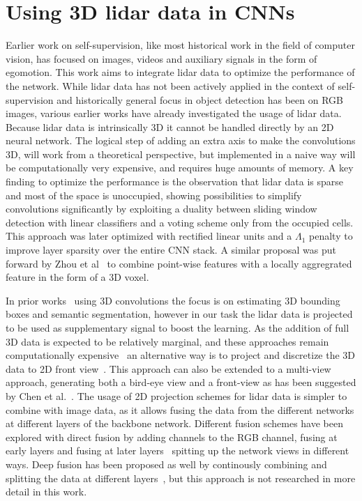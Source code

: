 \section{Using 3D lidar data in CNNs}
Earlier work on self-supervision, like most historical work in the field of computer vision, has focused on images, videos and auxiliary signals in the form of egomotion. This work aims to integrate lidar data to optimize the performance of the network. While lidar data has not been actively applied in the context of self-supervision and historically general focus in object detection has been on RGB images, various earlier works have already investigated the usage of lidar data. Because lidar data is intrinsically 3D it cannot be handled directly by an 2D neural network. The logical step of adding an extra axis to make the convolutions 3D, will work from a theoretical perspective, but implemented in a naive way will be computationally very expensive, and requires huge amounts of memory. A key finding to optimize the performance is the observation that lidar data is sparse and most of the space is unoccupied\cite{wang2015vote}, showing possibilities to simplify convolutions significantly by exploiting a duality between sliding window detection with linear classifiers and a voting scheme only from the occupied cells. This approach was later optimized with rectified linear units and a $\Lambda_1$ penalty to improve layer sparsity over the entire CNN stack\cite{engelcke2017}. A similar proposal was put forward by Zhou et al~\cite{zhou2017voxelnet} to combine point-wise features with a locally aggregrated feature in the form of a 3D voxel. 

In prior works~\cite{engelcke2017,zhou2017voxelnet,wang2015} using 3D convolutions the focus is on estimating 3D bounding boxes and semantic segmentation, however in our task the lidar data is projected to be used as supplementary signal to boost the learning. As the addition of full 3D data is expected to be relatively marginal, and these approaches remain computationally expensive~\cite{chen2017} an alternative way is to project and discretize the 3D data to 2D front view~\cite{li2016}. This approach can also be extended to a multi-view approach, generating both a bird-eye view and a front-view as has been suggested by Chen et al.~\cite{chen2017}. The usage of 2D projection schemes for lidar data is simpler to combine with image data, as it allows fusing the data from the different networks at different layers of the backbone network. Different fusion schemes have been explored with direct fusion by adding channels to the RGB channel, fusing at early layers and fusing at later layers~\cite{schlosser2016} spitting up the network views in different ways. Deep fusion has been proposed as well by continously combining and splitting the data at different layers~\cite{chen2017}, but this approach is not researched in more detail in this work.

